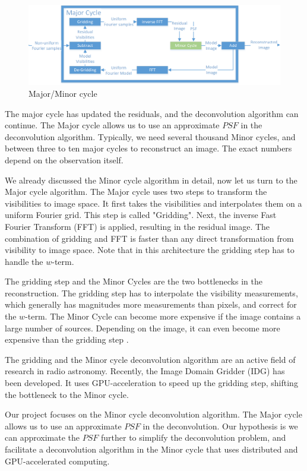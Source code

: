 \begin{figure}[h]
	\centering
	\includegraphics[width=0.8\linewidth]{./chapters/01.intro/Major-Minor4.png}
	\caption{Major/Minor cycle}
	\label{radio:major:figure}
\end{figure}

The major cycle has updated the residuals, and the deconvolution algorithm can continue. The Major cycle allows us to use an approximate $PSF$ in the deconvolution algorithm. Typically, we need several thousand Minor cycles, and between three to ten major cycles to reconstruct an image. The exact numbers depend on the observation itself.

We already discussed the Minor cycle algorithm in detail, now let us turn to the Major cycle algorithm. The Major cycle uses two steps to transform the visibilities to image space. It first takes the visibilities and interpolates them on a uniform Fourier grid. This step is called "Gridding". Next, the inverse Fast Fourier Transform (FFT) is applied, resulting in the residual image. The combination of gridding and FFT is faster than any direct transformation from visibility to image space. Note that in this architecture the gridding step has to handle the $w$-term.

The gridding step and the Minor Cycles are the two bottlenecks in the reconstruction. The gridding step has to interpolate the visibility measurements, which generally has magnitudes more measurements than pixels, and correct for the $w$-term. The Minor Cycle can become more expensive if the image contains a large number of sources. Depending on the image, it can even become more expensive than the gridding step \cite{offringa2017optimized}.

The gridding and the Minor cycle deconvolution algorithm are an active field of research in radio astronomy. Recently, the Image Domain Gridder (IDG)\cite{veenboer2017image} has been developed. It uses GPU-acceleration to speed up the gridding step, shifting the bottleneck to the Minor cycle.

Our project focuses on the Minor cycle deconvolution algorithm. The Major cycle allows us to use an approximate $PSF$ in the deconvolution. Our hypothesis is we can approximate the $PSF$ further to simplify the deconvolution problem, and facilitate a deconvolution algorithm in the Minor cycle that uses distributed and GPU-accelerated computing.

